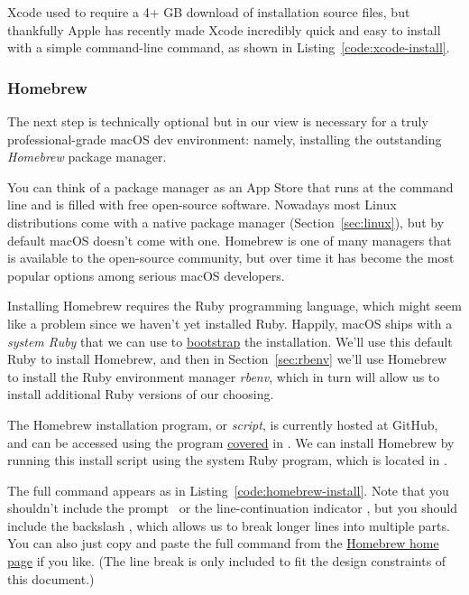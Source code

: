 Xcode used to require a 4+ GB download of installation source files, but thankfully Apple has recently made Xcode incredibly quick and easy to install with a simple command-line command, as shown in Listing~\ref{code:xcode-install}.

\begin{codelisting}
\label{code:xcode-install}
\end{codelisting}


\subsubsection{Homebrew}
\label{sec:homebrew}

The next step is technically optional but in our view is necessary for a truly professional-grade macOS dev environment: namely, installing the outstanding \emph{Homebrew} package manager.

You can think of a package manager as an App Store that runs at the command line and is filled with free open-source software. Nowadays most Linux distributions come with a native package manager (Section~\ref{sec:linux}), but by default macOS doesn't come with one. Homebrew is one of many managers that is available to the open-source community, but over time it has become the most popular options among serious macOS developers.

Installing Homebrew requires the Ruby programming language, which might seem like a problem since we haven't yet installed Ruby. Happily, macOS ships with a \emph{system Ruby} that we can use to \href{https://en.wikipedia.org/wiki/Bootstrapping}{bootstrap} the installation. We'll use this default Ruby to install Homebrew, and then in Section~\ref{sec:rbenv} we'll use Homebrew to install the Ruby environment manager \emph{rbenv}, which in turn will allow us to install additional Ruby versions of our choosing.

The Homebrew installation program, or \emph{script}, is currently hosted at GitHub, and can be accessed using the  program \href{https://www.learnenough.com/command-line-tutorial#sec-downloading_a_file}{covered} in \lecl. We can install Homebrew by running this install script using the system Ruby program, which is located in .

The full command appears as in Listing~\ref{code:homebrew-install}. Note that you shouldn't include the prompt~\kode{\$} or the line-continuation indicator \kode{>}, but you should include the backslash \kode{\textbackslash}, which allows us to break longer lines into multiple parts. You can also just copy and paste the full command from the \href{http://brew.sh/}{Homebrew home page} if you like. (The line break is only included to fit the design constraints of this document.)

